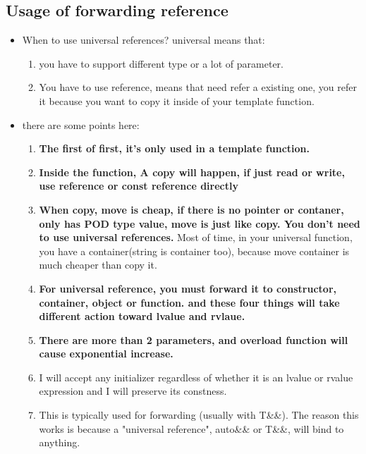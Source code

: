 \documentclass[a4paper,11pt,twoside]{book}
\begin{document}
\subsection{Usage of forwarding reference}
\begin{itemize}
\item When to use universal references? universal means that:
\begin{enumerate}
	\item you have to support different type or a lot of parameter. 
	\item You have to use reference, means that need refer a existing one, you refer it because you want to copy it inside of your template function. 
\end{enumerate}

\item there are some points here:
	\begin{enumerate}
		\item \textbf{The first of first, it's only used in a template function.}
		
		\item \textbf{Inside the function, A copy will happen, if just read or write, use reference or const reference directly}
		
		\item \textbf{When copy, move is cheap, if there is no pointer or contaner, only has POD type value, move is just like copy. You don't need to use universal references.} Most of time, in your universal function, you have a container(string is container too), because move container is much cheaper than copy it.
		
		\item \textbf{For universal reference, you must forward it to constructor, container, object or function. and these four things will take different action toward lvalue and rvlaue.}
		
		\item \textbf{There are more than 2 parameters, and overload function will cause exponential increase.}

		\item I will accept any initializer regardless of whether it is an lvalue or rvalue expression and I will preserve its constness. 

		\item This is typically used for forwarding (usually with T\&\&). The reason this works is because a "universal reference", auto\&\& or T\&\&, will bind to anything.  


\end{enumerate}
\end{itemize}
\end{document}
